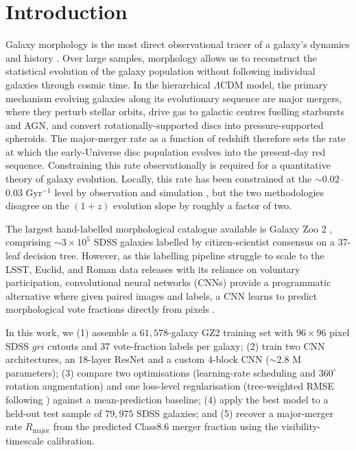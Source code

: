 \documentclass[10pt,preprint2]{aastex}
\begin{document}
\section{Introduction}
\label{sec:intro}

Galaxy morphology is the most direct observational tracer of a galaxy's dynamics and history \citep{Conselice2014}. Over large samples, morphology allows us to reconstruct the statistical evolution of the galaxy population without following individual galaxies through cosmic time. In the hierarchical $\Lambda$CDM model, the primary mechanism evolving galaxies along its evolutionary sequence are major mergers, where they perturb stellar orbits, drive gas to galactic centres fuelling starbursts and AGN, and convert rotationally-supported discs into pressure-supported spheroids. The major-merger rate as a function of redshift therefore sets the rate at which the early-Universe disc population evolves into the present-day red sequence. Constraining this rate observationally is required for a quantitative theory of galaxy evolution. Locally, this rate has been constrained at the $\sim 0.02$--$0.03$ Gyr$^{-1}$ level by observation \citep{Lotz2011} and simulation \citep{RodriguezGomez2015}, but the two methodologies disagree on the $(1 + z)$ evolution slope by roughly a factor of two.

The largest hand-labelled morphological catalogue available is Galaxy Zoo 2 \citep[GZ2;][]{Willett2013}, comprising $\sim 3\times10^5$ SDSS galaxies labelled by citizen-scientist consensus on a 37-leaf decision tree. However, as this labelling pipeline struggle to scale to the LSST, Euclid, and Roman data releases with its reliance on voluntary participation, convolutional neural networks (CNNs) provide a programmatic alternative where given paired images and labels, a CNN learns to predict morphological vote fractions directly from pixels \citep{Krizhevsky2020}.

In this work, we (1) assemble a $61{,}578$-galaxy GZ2 training set with $96\times96$ pixel SDSS $gri$ cutouts and 37 vote-fraction labels per galaxy; (2) train two CNN architectures, an 18-layer ResNet \citep[$\sim 11.2$ M parameters;][]{He2015} and a custom 4-block CNN ($\sim 2.8$ M parameters); (3) compare two optimisations (learning-rate scheduling and $360^\circ$ rotation augmentation) and one loss-level regularisation (tree-weighted RMSE following \citealt{Dieleman2015}) against a mean-prediction baseline; (4) apply the best model to a held-out test sample of $79{,}975$ SDSS galaxies; and (5) recover a major-merger rate $R_{\mathrm{major}}$ from the predicted Class8.6 merger fraction using the \citet{Lotz2011} visibility-timescale calibration.
\end{document}
